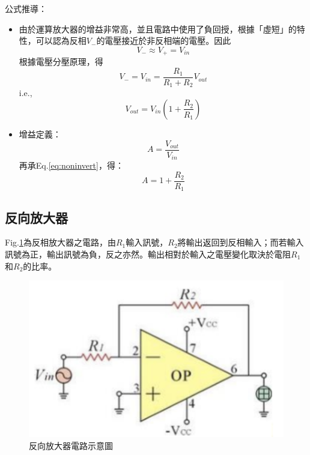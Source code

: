 \documentclass[12pt,a4paper]{article}
\begin{document}
\begin{CJK}{UTF8}{bkai}
公式推導：
\begin{itemize}
    \item 由於運算放大器的增益非常高，並且電路中使用了負回授，根據「虛短」的特性，可以認為反相$V_-$的電壓接近於非反相端的電壓。因此
    \begin{equation}
        V_-\approx V_+ = V_{in}
    \end{equation}
    根據電壓分壓原理，得
    \begin{equation}
        V_-=V_{in}=\frac{R_1}{R_1+R_2}V_{out}
    \end{equation}
    i.e.,
    \begin{equation}
    \label{eq:noninvert}
        V_{out} = V_{in}\left(1+\frac{R_2}{R_1}\right)
    \end{equation}
    \item 增益定義：
    \begin{equation}
        A=\frac{V_{out}}{V_{in}}
    \end{equation}
    再承Eq.\ref{eq:noninvert}，得：
    \begin{equation}
        A=1+\frac{R_2}{R_1}
    \end{equation}
\end{itemize}

\subsection{反向放大器}
\hfill

Fig.\ref{fig:invert}為反相放大器之電路，由$R_1$輸入訊號，$R_2$將輸出返回到反相輸入；而若輸入訊號為正，輸出訊號為負，反之亦然。輸出相對於輸入之電壓變化取決於電阻$R_1$和$R_2$的比率。 

\begin{figure}[h]
    \centering
    \includegraphics[width=0.5\linewidth]{figures/invert.png}
    \caption{反向放大器電路示意圖}
    \label{fig:invert}
\end{figure}



\end{CJK}
\end{document}
